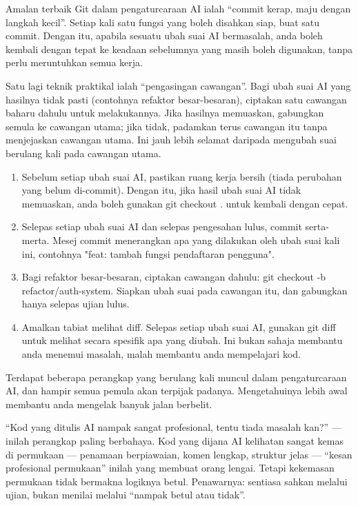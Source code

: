 Amalan terbaik Git dalam pengaturcaraan AI ialah “commit kerap, maju dengan langkah kecil”. Setiap kali satu fungsi yang boleh disahkan siap, buat satu commit. Dengan itu, apabila sesuatu ubah suai AI bermasalah, anda boleh kembali dengan tepat ke keadaan sebelumnya yang masih boleh digunakan, tanpa perlu meruntuhkan semua kerja.

Satu lagi teknik praktikal ialah “pengasingan cawangan”. Bagi ubah suai AI yang hasilnya tidak pasti (contohnya refaktor besar-besaran), ciptakan satu cawangan baharu dahulu untuk melakukannya. Jika hasilnya memuaskan, gabungkan semula ke cawangan utama; jika tidak, padamkan terus cawangan itu tanpa menjejaskan cawangan utama. Ini jauh lebih selamat daripada mengubah suai berulang kali pada cawangan utama.

\begin{enumerate}
  \item Sebelum setiap ubah suai AI, pastikan ruang kerja bersih (tiada perubahan yang belum di-commit). Dengan itu, jika hasil ubah suai AI tidak memuaskan, anda boleh gunakan git checkout . untuk kembali dengan cepat.
  \item Selepas setiap ubah suai AI dan selepas pengesahan lulus, commit serta-merta. Mesej commit menerangkan apa yang dilakukan oleh ubah suai kali ini, contohnya "feat: tambah fungsi pendaftaran pengguna".
  \item Bagi refaktor besar-besaran, ciptakan cawangan dahulu: git checkout -b refactor/auth-system. Siapkan ubah suai pada cawangan itu, dan gabungkan hanya selepas ujian lulus.
  \item Amalkan tabiat melihat diff. Selepas setiap ubah suai AI, gunakan git diff untuk melihat secara spesifik apa yang diubah. Ini bukan sahaja membantu anda menemui masalah, malah membantu anda mempelajari kod.
\end{enumerate}


Terdapat beberapa perangkap yang berulang kali muncul dalam pengaturcaraan AI, dan hampir semua pemula akan terpijak padanya. Mengetahuinya lebih awal membantu anda mengelak banyak jalan berbelit.


“Kod yang ditulis AI nampak sangat profesional, tentu tiada masalah kan?” — inilah perangkap paling berbahaya. Kod yang dijana AI kelihatan sangat kemas di permukaan — penamaan berpiawaian, komen lengkap, struktur jelas — “kesan profesional permukaan” inilah yang membuat orang lengai. Tetapi kekemasan permukaan tidak bermakna logiknya betul. Penawarnya: sentiasa sahkan melalui ujian, bukan menilai melalui “nampak betul atau tidak”.

